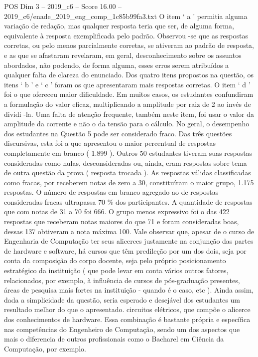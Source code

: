 \begin{textsample}{POS Dim 3 – 2019\_c6 – Score 16.00 – 2019\_c6/enade\_2019\_eng\_comp\_1c85b99fa3.txt}
O item ‘ a ’ permitia alguma variação de redação, mas qualquer resposta teria que ser, de alguma forma, equivalente à resposta exemplificada pelo padrão.
Observou -se que as respostas corretas, ou pelo menos parcialmente corretas, se ativeram ao padrão de resposta, e as que se afastaram revelaram, em geral, desconhecimento sobre os assuntos abordados, não podendo, de forma alguma, esses erros serem atribuídos a qualquer falta de clareza do enunciado.
Dos quatro itens propostos na questão, os itens ‘ b ’ e ‘ c ’ foram os que apresentaram mais respostas corretas.
O item ‘ d ’ foi o que ofereceu maior dificuldade.
Em muitos casos, os estudantes confundiram a formulação do valor eficaz, multiplicando a amplitude por raiz de 2 ao invés de dividi -la.
Uma falta de atenção frequente, também neste item, foi usar o valor da amplitude da corrente e não o da tensão para o cálculo.
No geral, o desempenho dos estudantes na Questão 5 pode ser considerado fraco.
Das três questões discursivas, esta foi a que apresentou o maior percentual de respostas completamente em branco ( 1.899 ).
Outros 50 estudantes tiveram suas respostas consideradas como nulas, desconsideradas ou, ainda, eram respostas sobre tema de outra questão da prova ( resposta trocada ).
As respostas válidas classificadas como fracas, por receberem notas de zero a 30, constituíram o maior grupo, 1.175 respostas.
O número de respostas em branco agregado ao de respostas consideradas fracas ultrapassa 70 \% dos participantes.
A quantidade de respostas que com notas de 31 a 70 foi 666.
O grupo menos expressivo foi o das 422 respostas que receberam notas maiores do que 71 e foram consideradas boas, dessas 137 obtiveram a nota máxima 100.
Vale observar que, apesar de o curso de Engenharia de Computação ter seus alicerces justamente na conjunção das partes de hardware e software, há cursos que têm predileção por um dos dois, seja por conta da composição do corpo docente, seja pelo próprio posicionamento estratégico da instituição ( que pode levar em conta vários outros fatores, relacionados, por exemplo, à influência de cursos de pós-graduação presentes, áreas de pesquisa mais fortes na instituição - quando é o caso, etc ).
Ainda assim, dada a simplicidade da questão, seria esperado e desejável dos estudantes um resultado melhor do que o apresentado. circuitos elétricos, que compõe o alicerce dos conhecimentos de hardware.
Essa combinação é bastante própria e específica nas competências do Engenheiro de Computação, sendo um dos aspectos que mais o diferencia de outros profissionais como o Bacharel em Ciência da Computação, por exemplo.

\end{textsample}

